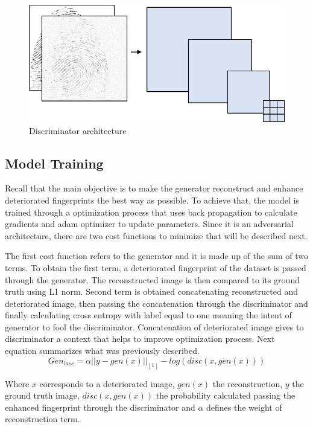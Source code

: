 \documentclass[a4paper,fleqn]{cas-dc}
\begin{document}
\begin{figure}[htbp]
\centerline{\includegraphics[scale=0.4]{figs/discriminator.png}}
\caption{Discriminator architecture}
\label{fig5}
\end{figure}

\subsection{Model Training}
\label{sec:MT}
Recall that the main objective is to make the generator reconstruct and enhance deteriorated fingerprints the best way as possible. To achieve that, the model is trained through a optimization process that uses back propagation to calculate gradients and adam optimizer to update parameters. Since it is an adversarial architecture, there are two cost functions to minimize that will be described next.

The first cost function refers to the generator and it is made up of the sum of two terms. To obtain the first term, a deteriorated fingerprint of the dataset is passed through the generator. The reconstructed image is then compared to its ground truth using L1 norm. Second term is obtained concatenating reconstructed and deteriorated image, then passing the concatenation through the discriminator and finally calculating cross entropy with label equal to one meaning the intent of generator to fool the discriminator. Concatenation of deteriorated image gives to discriminator a context that helps to improve optimization process. Next equation summarizes what was previously described.
\begin{equation}
    Gen_{loss} = \alpha||y-gen(x)||_{[1]} - log(disc(x,gen(x)))
\end{equation}

Where $x$ corresponds to a deteriorated image, $gen(x)$ the reconstruction, $y$ the ground truth image, $disc(x,gen(x))$ the probability calculated passing the enhanced fingerprint through the discriminator and $\alpha$ defines the weight of reconstruction term.
\end{document}
